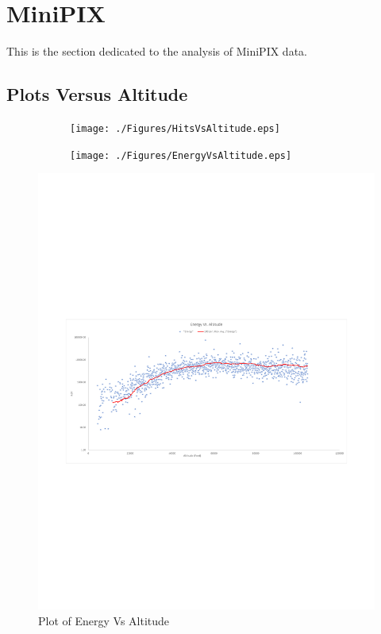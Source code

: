 \section{MiniPIX}
\label{sec:Minipix}
This is the section dedicated to the analysis of MiniPIX data.

\subsection{Plots Versus Altitude}
\centering
\begin{figure}[h!]
	
	\begin{subfigure}[b]{\textwidth}
		\texttt{[image: ./Figures/HitsVsAltitude.eps]}
	\end{subfigure}
	\begin{subfigure}[b]{\textwidth}
		\texttt{[image: ./Figures/EnergyVsAltitude.eps]}
	\end{subfigure}
	
	\label{fig:HitsVsAltitude}
	
\end{figure}

\begin{figure}[h]
\centering
\includegraphics[width=\textwidth]{./Figures/EnergyVsAltitude.png}
\caption{Plot of Energy Vs Altitude}
\label{fig:Energy Vs Altitude} 
\end{figure}
